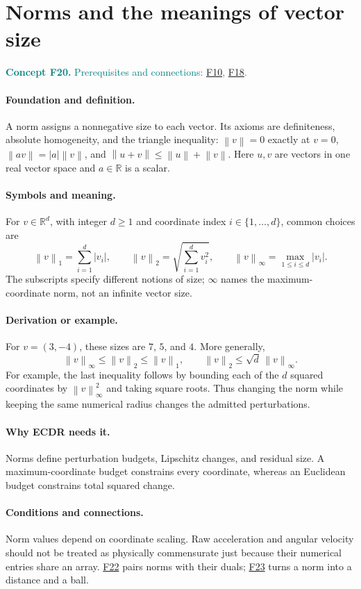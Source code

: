 \documentclass[11pt,a4paper]{article}
\newcommand{\R}{\mathbb R}
\newcommand{\norm}[1]{\left\lVert#1\right\rVert}
\newcommand{\conceptid}{Front matter}
\newcommand{\concept}[3]{\clearpage\renewcommand{\conceptid}{#1}%
\section{#2}\label{concept:#1}%
\textcolor{teal}{\textbf{Concept #1.} Prerequisites and connections: #3.}\par
\typeout{ECDR-CONCEPT-START #1 PAGE=\thepage}}
\begin{document}
\concept{F20}{Norms and the meanings of vector size}{\hyperref[concept:F10]{F10}, \hyperref[concept:F18]{F18}}
\paragraph{Foundation and definition.}
A norm assigns a nonnegative size to each vector. Its axioms are
definiteness, absolute homogeneity, and the triangle inequality:
$\norm{v}=0$ exactly at $v=0$,
$\norm{a v}=|a|\norm{v}$, and
$\norm{u+v}\le\norm{u}+\norm{v}$.
Here $u,v$ are vectors in one real vector space and $a\in\R$ is a scalar.
\paragraph{Symbols and meaning.}
For $v\in\R^d$, with integer $d\ge1$ and coordinate index
$i\in\{1,\ldots,d\}$, common choices are
\[
 \norm{v}_1=\sum_{i=1}^d|v_i|,\qquad
 \norm{v}_2=\sqrt{\sum_{i=1}^d v_i^2},\qquad
 \norm{v}_\infty=\max_{1\le i\le d}|v_i|.
\]
The subscripts specify different notions of size; $\infty$ names the
maximum-coordinate norm, not an infinite vector size.
\paragraph{Derivation or example.}
For $v=(3,-4)$, these sizes are $7$, $5$, and $4$. More generally,
\[
 \norm{v}_\infty\le\norm{v}_2\le\norm{v}_1,
 \qquad \norm{v}_2\le\sqrt d\,\norm{v}_\infty.
\]
For example, the last inequality follows by bounding each of the $d$
squared coordinates by $\norm{v}_\infty^2$ and taking square roots.
Thus changing the norm while keeping the same numerical radius changes
the admitted perturbations.
\paragraph{Why ECDR needs it.}
Norms define perturbation budgets, Lipschitz changes, and residual size.
A maximum-coordinate budget constrains every coordinate, whereas an
Euclidean budget constrains total squared change.
\paragraph{Conditions and connections.}
Norm values depend on coordinate scaling. Raw acceleration and angular
velocity should not be treated as physically commensurate just because
their numerical entries share an array. \hyperref[concept:F22]{F22} pairs norms with their duals;
\hyperref[concept:F23]{F23} turns a norm into a distance and a ball.
\par\label{endconcept:F20}
\end{document}
